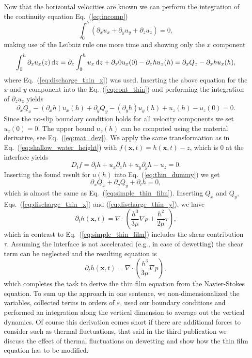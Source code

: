 Now that the horizontal velocities are known we can perform the integration of the continuity equation Eq.~(\ref{eq:incomp})
\begin{equation}\label{eq:cont_thin}
    \int_0^h(\partial_x u_x + \partial_y u_y + \partial_z u_z) = 0,
\end{equation}
making use of the Leibniz rule one more time and showing only the $x$ component
\begin{equation}
    \int_0^h \partial_x u_x(z) \mathop{}\!\mathrm{d} z = \partial_x\int_0^h u_x\mathop{}\!\mathrm{d} z + \partial_x 0 u_x(0) - \partial_x h u_x(h) = \partial_x Q_x - \partial_x h u_x(h),  
\end{equation}
where Eq.~(\ref{eq:discharge_thin_x}) was used.
Inserting the above equation for the $x$ and $y$-component into the Eq.~(\ref{eq:cont_thin}) and performing the integration of $\partial_z u_z$ yields
\begin{equation}\label{eq:thin_dummy}
    \partial_x Q_x - (\partial_x h) u_x(h) + \partial_y Q_y - (\partial_y h) u_y(h) + u_z(h) - u_z(0) = 0.
\end{equation}
Since the no-slip boundary condition holds for all velocity components we set $u_z(0) = 0$.
The upper bound $u_z(h)$ can be computed using the material derivative, see Eq.~(\ref{eq:mat_dev}). 
We apply the same transformation as in Eq.~(\ref{eq:shallow_water_height}) with $f(\mathbf{x},t) = h(\mathbf{x},t) - z$, which is $0$ at the interface yields
\begin{equation}\label{eq:mat_uz_h}
    D_t f = \partial_t h + u_x\partial_x h + u_y\partial_y h - u_z = 0.
\end{equation}
Inserting the found result for $u(h)$ into Eq.~(\ref{eq:thin_dummy}) we get
\begin{equation}\label{eq:thin_obsc}
    \partial_x Q_x + \partial_y Q_y + \partial_t h = 0,
\end{equation}
which is almost the same as Eq.~(\ref{eq:simple_thin_film}).
Inserting $Q_x$ and $Q_y$, Eqs.~(\ref{eq:discharge_thin_x}) and (\ref{eq:discharge_thin_y}), we have
\begin{equation}
    \partial_t h(\mathbf{x},t) = \nabla\cdot\left(\frac{h^3}{3\mu}\nabla p + \frac{h^2}{2\mu}\tau\right),
\end{equation}
which in contrast to Eq.~(\ref{eq:simple_thin_film}) includes the shear contribution $\tau$.
Assuming the interface is not accelerated (e.g., in case of dewetting) the shear term can be neglected and the resulting equation is 
\begin{equation}\label{eq:thin_final}
    \partial_t h(\mathbf{x},t) = \nabla\cdot\left(\frac{h^3}{3\mu}\nabla p\right),
\end{equation}
which completes the task to derive the thin film equation from the Navier-Stokes equation. 
To sum up the approach in one sentence, we non-dimensionalized the variables, collected terms in orders of $\varepsilon$, used our boundary conditions and performed an integration along the vertical dimension to average out the vertical dynamics.
Of course this derivation comes short if there are additional forces to consider such as thermal fluctuations, that said in the third publication we discuss the effect of thermal fluctuations on dewetting and show how the thin film equation has to be modified.

